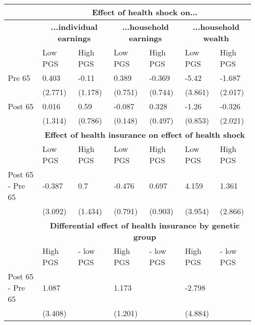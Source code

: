 % 
\begin{tabular}{l| p{2.5cm}p{2.5cm}| p{2.5cm}p{2.5cm}| p{2.5cm}p{2.5cm}}
  & \multicolumn{6}{c}{\textbf{Effect of health shock on...}} \\
 \toprule
  & \multicolumn{2}{c}{ \textbf{...individual earnings}} &  \multicolumn{2}{c}{ \textbf{...household earnings}} &  \multicolumn{2}{c}{ \textbf{...household wealth}}  \\
 \midrule
 & Low PGS & High PGS & Low PGS & High PGS & Low PGS & High PGS \\ 
   \midrule
Pre 65 & 0.403 & -0.11 & 0.389 & -0.369 & -5.42 & -1.687 \\ 
   & (2.771) & (1.178) & (0.751) & (0.744) & (3.861) & (2.017) \\ 
  Post 65 & 0.016 & 0.59 & -0.087 & 0.328 & -1.26 & -0.326 \\ 
   & (1.314) & (0.786) & (0.148) & (0.497) & (0.853) & (2.021) \\ 
   \toprule & \multicolumn{6}{c}{ \textbf{Effect of health insurance on effect of health shock}} \\
 \midrule
 & Low PGS & High PGS & Low PGS & High PGS & Low PGS & High PGS \\ 
   \midrule
Post 65 - Pre 65 & -0.387 & 0.7 & -0.476 & 0.697 & 4.159 & 1.361 \\ 
   & (3.092) & (1.434) & (0.791) & (0.903) & (3.954) & (2.866) \\ 
   \toprule & \multicolumn{6}{c}{ \textbf{Differential effect of health insurance by genetic group}} \\
 \midrule
 & High PGS  & - low PGS & High PGS  & - low PGS & High PGS  & - low PGS \\ 
   \midrule
Post 65 - Pre 65 & 1.087 &  & 1.173 &  & -2.798 &  \\ 
   & (3.408) &  & (1.201) &  & (4.884) &  \\ 
  \end{tabular}
